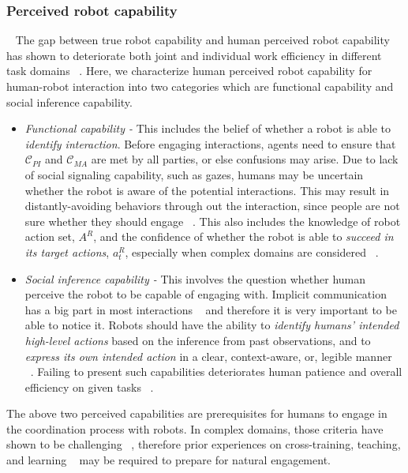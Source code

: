 \documentclass[letterpaper, 10 pt, conference]{ieeeconf}  %
\begin{document}
\subsubsection{Perceived robot capability}~\label{sec:perceived}
The gap between true robot capability and human perceived robot capability has shown to deteriorate both joint and individual work efficiency in different task domains ~\cite{dragan2015effects}. Here, we characterize human perceived robot capability for human-robot interaction into two categories which are functional capability and social inference capability.

\begin{itemize}
	\item \textit{Functional capability - } This includes the belief of whether a robot is able to \textit{identify interaction}. Before engaging interactions, agents need to ensure that $\mathcal{C}_{PI}$ and $\mathcal{C}_{MA}$ are met by all parties, or else confusions may arise. Due to lack of social signaling capability, such as gazes, humans may be uncertain whether the robot is aware of the potential interactions. This may result in distantly-avoiding behaviors through out the interaction, since people are not sure whether they should engage ~\cite{dragan2015effects}. This also includes the knowledge of robot action set, $A^R$, and the confidence of whether the robot is able to \textit{succeed in its target actions}, $a^R_t$, especially when complex domains are considered ~\cite{chen2018planning}. 
	\item \textit{Social inference capability - } This involves the question whether human perceive the robot to be capable of engaging with. Implicit communication has a big part in most interactions ~\cite{knepper2017implicit} and therefore it is very important to be able to notice it. Robots should have the ability to \textit{identify humans' intended high-level actions} based on the inference from past observations, and to \textit{express its own intended action} in a clear, context-aware, or, legible manner ~\cite{dragan2013legibility}. Failing to present such capabilities deteriorates human patience and overall efficiency on given tasks ~\cite{cha2015perceived}. 
\end{itemize}

The above two perceived capabilities are prerequisites for humans to engage in the coordination process with robots. In complex domains, those criteria have shown to be challenging ~\cite{knepper2017implicit}, therefore prior experiences on cross-training, teaching, and learning ~\cite{zhang2017plan} may be required to prepare for natural engagement. 
\end{document}

